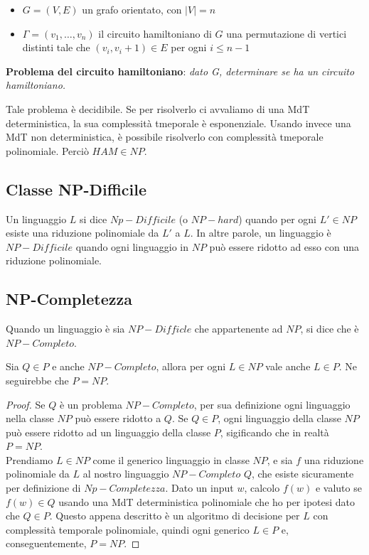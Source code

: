 \begin{itemize}
	\item $G = (V, E)$ un grafo orientato, con $|V| = n$
	\item $\Gamma = (v_1, \ldots, v_n)$ il circuito hamiltoniano di $G$
		\subitem una permutazione di vertici distinti tale che $(v_i, v_i+1) \in E$ per ogni $i \leq n-1$
\end{itemize}

\textbf{Problema del circuito hamiltoniano}: \textit{dato G, determinare se ha un circuito hamiltoniano.}

Tale problema è decidibile. Se per risolverlo ci avvaliamo di una MdT deterministica, la sua complessità tmeporale è esponenziale. Usando invece una MdT non deterministica, è possibile risolverlo con complessità tmeporale polinomiale. Perciò $HAM \in NP$.

\subsection{Classe NP-Difficile}

\begin{defn}
	Un linguaggio $L$ si dice $Np-Difficile$ (o $NP-hard$) quando per ogni $L' \in NP$ esiste una riduzione polinomiale da $L'$ a $L$. In altre parole, un linguaggio è $NP-Difficile$ quando ogni linguaggio in $NP$ può essere ridotto ad esso con una riduzione polinomiale.
\end{defn}

\subsection{NP-Completezza}

\begin{defn}
	Quando un linguaggio è sia $NP-Difficle$ che appartenente ad $NP$, si dice che è $NP-Completo$.
\end{defn}

\vspace{0.2cm}

\begin{lemm}
	Sia $Q \in P$ e anche $NP-Completo$, allora per ogni $L \in NP$ vale anche $L \in P$. Ne seguirebbe che $P = NP$.
\end{lemm}

\begin{proof}
	Se $Q$ è un problema $NP-Completo$, per sua definizione ogni linguaggio nella classe $NP$ può essere ridotto a $Q$. Se $Q \in P$, ogni linguaggio della classe $NP$ può essere ridotto ad un linguaggio della classe $P$, sigificando che in realtà $P = NP$. \\ Prendiamo $L \in NP$ come il generico linguaggio in classe $NP$, e sia $f$ una riduzione polinomiale da $L$ al nostro linguaggio $NP-Completo$ $Q$, che esiste sicuramente per definizione di $Np-Completezza$. Dato un input $w$, calcolo $f(w)$ e valuto se $f(w) \in Q$ usando una MdT deterministica polinomiale che ho per ipotesi dato che $Q \in P$. Questo appena descritto è un algoritmo di decisione per $L$ con complessità temporale polinomiale, quindi ogni generico $L \in P$ e, conseguentemente, $P = NP$.

\end{proof}

